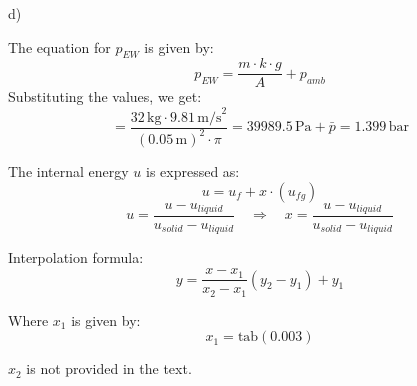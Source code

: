 d)

The equation for \( p_{EW} \) is given by:
\[ p_{EW} = \frac{m \cdot k \cdot g}{A} + p_{amb} \]
Substituting the values, we get:
\[ = \frac{32 \, \text{kg} \cdot 9.81 \, \text{m/s}^2}{(0.05 \, \text{m})^2 \cdot \pi} = 39989.5 \, \text{Pa} + \bar{p} = 1.399 \, \text{bar} \]

The internal energy \( u \) is expressed as:
\[ u = u_f + x \cdot (u_{fg}) \]
\[ u = \frac{u - u_{liquid}}{u_{solid} - u_{liquid}} \quad \Rightarrow \quad x = \frac{u - u_{liquid}}{u_{solid} - u_{liquid}} \]

Interpolation formula:
\[ y = \frac{x - x_1}{x_2 - x_1} (y_2 - y_1) + y_1 \]

Where \( x_1 \) is given by:
\[ x_1 = \text{tab}(0.003) \]

\( x_2 \) is not provided in the text.